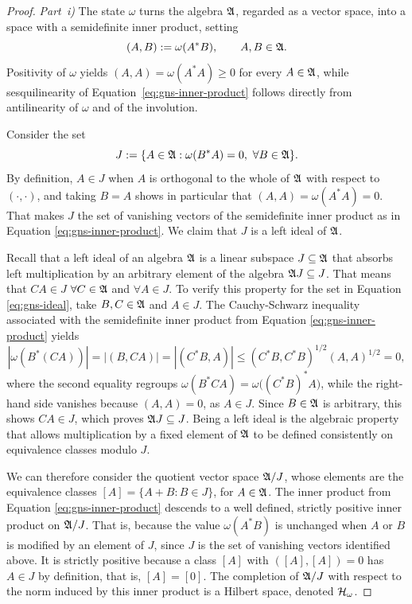 \begin{proof}
	\textit{Part~i)} The state $\omega$ turns the algebra $\mathfrak{A}$, regarded as a vector space, into a space with a semidefinite inner product, setting
	\begin{equation}
		\label{eq:gns-inner-product}
		(A,B) := \omega(A^*B), \qquad A,B \in \mathfrak{A}.
	\end{equation}
	Positivity of $\omega$ yields $(A,A) = \omega(A^*A) \ge 0$ for every $A \in \mathfrak{A}$, while sesquilinearity of Equation~\eqref{eq:gns-inner-product} follows directly from antilinearity  of $\omega$ and of the involution. 
	
	\noindent Consider the set
	\begin{equation}
		\label{eq:gns-ideal}
		J := \{A \in \mathfrak{A} : \omega(B^*A) = 0, \ \forall B \in \mathfrak{A}\}.
	\end{equation}
	By definition, $A \in J$ when $A$ is orthogonal to the whole of $\mathfrak{A}$ with respect to $(\cdot,\cdot)$, and taking $B=A$ shows in particular that $(A,A) = \omega(A^*A) = 0$. That makes $J$ the set of vanishing vectors of the semidefinite inner product as in Equation \eqref{eq:gns-inner-product}. We claim that $J$ is a left ideal of $\mathfrak{A}$. 
	
	Recall that a left ideal of an algebra $\mathfrak{A}$ is a linear subspace $J \subseteq \mathfrak{A}$ that absorbs left multiplication by an arbitrary element of the algebra $\mathfrak{A} J \subseteq J$. That means that $CA \in J$ $\forall C \in \mathfrak{A}$ and $\forall A \in J$. To verify this property for the set in Equation \eqref{eq:gns-ideal}, take $B,C \in \mathfrak{A}$ and $A \in J$. The Cauchy-Schwarz inequality associated with the semidefinite inner product from Equation \eqref{eq:gns-inner-product} yields
	\begin{equation}
		|\omega(B^*(CA))| = |(B,CA)| = |(C^*B,A)| \le (C^*B,C^*B)^{1/2}(A,A)^{1/2} = 0,
	\end{equation}
	where the second equality regroups $\omega(B^*CA) = \omega\big((C^*B)^*A\big)$, while the right-hand side vanishes because $(A,A) = 0$, as $A \in J$. Since $B \in \mathfrak{A}$ is arbitrary, this shows $CA \in J$, which proves $\mathfrak{A} J \subseteq J$. Being a left ideal is the algebraic property that allows multiplication by a fixed element of $\mathfrak{A}$ to be defined consistently on equivalence classes modulo $J$. 
	
	We can therefore consider the quotient vector space $\mathfrak{A} / J$, whose elements are the equivalence classes $[A] = \{A + B : B \in J\}$, for $A \in \mathfrak{A}$. The inner product from Equation \eqref{eq:gns-inner-product} descends to a well defined, strictly positive inner product on $\mathfrak{A}/J$. That is, because the value $\omega(A^*B)$ is unchanged when $A$ or $B$ is modified by an element of $J$, since $J$ is the set of vanishing vectors identified above. It is strictly positive because a class $[A]$ with $([A],[A]) = 0$ has $A \in J$ by definition, that is, $[A] = [0]$. The completion of $\mathfrak{A}/J$ with respect to the norm induced by this inner product is a Hilbert space, denoted $\H_\omega$.
	

\end{proof}
